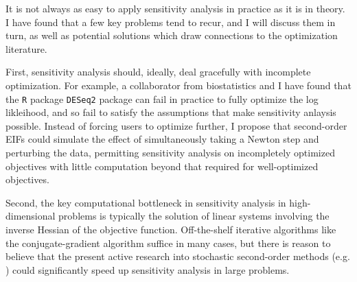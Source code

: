 It is not always as easy to apply sensitivity analysis in practice as it is in
theory.  I have found that a few key problems tend to recur, and I will discuss
them in turn, as well as potential solutions which draw connections to the
optimization literature.

First, sensitivity analysis should, ideally, deal gracefully with incomplete
optimization.  For example, a collaborator from biostatistics and I have found
that the \texttt{R} package \texttt{DESeq2} package \citep{deseq2} can fail in
practice to fully optimize the log likleihood, and so fail to satisfy the
assumptions that make sensitivity anlaysis possible.  Instead of forcing users
to optimize further, I propose that second-order EIFs could simulate the effect
of simultaneously taking a Newton step and perturbing the data, permitting
sensitivity analysis on incompletely optimized objectives with little
computation beyond that required for well-optimized objectives.
%
%

Second, the key computational bottleneck in sensitivity analysis in
high-dimensional problems is typically the solution of linear systems involving
the inverse Hessian of the objective function. Off-the-shelf iterative
algorithms like the conjugate-gradient algorithm \citep{nocedal:2006:numerical}
suffice in many cases, but there is reason to believe that the present active
research into stochastic second-order methods (e.g.
\citet{agarwal:2017:secondorder, berahas:2020:newtonsketch}) could significantly
speed up sensitivity analysis in large problems.

